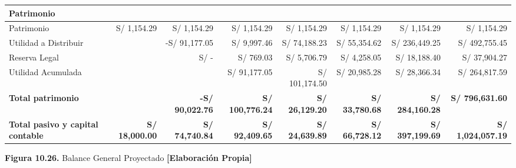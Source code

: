 \begin{table}[H]
{\begin{tabular}{|p{3.6cm}|r|r|r|r|r|r|r|}
\multicolumn{8}{|l|}{\textbf{Patrimonio}} \\ \hline
Patrimonio 
& S/ 1,154.29 & S/ 1,154.29 & S/ 1,154.29 & S/ 1,154.29 & S/ 1,154.29 & S/ 1,154.29 & S/ 1,154.29 \\ \hline

Utilidad a Distribuir 
&  & -S/ 91,177.05 & S/ 9,997.46 & S/ 74,188.23 & S/ 55,354.62 & S/ 236,449.25 & S/ 492,755.45 \\ \hline

Reserva Legal 
&  & S/ - & S/ 769.03 & S/ 5,706.79 & S/ 4,258.05 & S/ 18,188.40 & S/ 37,904.27 \\ \hline

Utilidad Acumulada 
&  &  & S/ 91,177.05 & S/ 101,174.50 & S/ 20,985.28 & S/ 28,366.34 & S/ 264,817.59 \\ \hline

\textbf{Total patrimonio} 
&  & \textbf{-S/ 90,022.76} & \textbf{S/ 100,776.24} & \textbf{S/ 26,129.20} & \textbf{S/ 33,780.68} & \textbf{S/ 284,160.28} & \textbf{S/ 796,631.60} \\ \hline

\textbf{Total pasivo y capital contable} 
& \textbf{S/ 18,000.00} & \textbf{S/ 74,740.84} & \textbf{S/ 92,409.65} & \textbf{S/ 24,639.89} & \textbf{S/ 66,728.12} & \textbf{S/ 397,199.69} & \textbf{S/ 1,024,057.19} \\ \hline

\end{tabular}%
}

\vspace{0.2cm}
\textbf{Figura 10.26.} Balance General Proyectado \textbf{[Elaboración Propia]}
\end{table}
